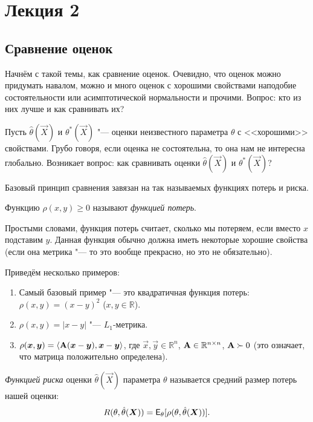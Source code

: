 
\section{Лекция 2}
\subsection{Сравнение оценок}
Начнём с такой темы, как сравнение оценок. Очевидно, что оценок можно придумать навалом, можно и много оценок с хорошими свойствами наподобие состоятельности или асимптотической нормальности и прочими. Вопрос: кто из них лучше и как сравнивать их?

Пусть $\hat{\theta}(\vec{X})$ и $\theta^{*}(\vec{X})$ "--- оценки неизвестного параметра $\theta$ с <<хорошими>> свойствами. Грубо говоря, если оценка не состоятельна, то она нам не интересна глобально. Возникает вопрос: как сравнивать оценки $\hat{\theta}(\vec{X})$ и $\theta^{*}(\vec{X})$?

Базовый принцип сравнения завязан на так называемых функциях потерь и риска. 
\begin{definition}
	Функцию $\rho(x, y) \geq 0$ называют \emph{функцией потерь}.
\end{definition}
Простыми словами, функция потерь считает, сколько мы потеряем, если вместо $x$ подставим $y$. Данная функция обычно должна иметь некоторые хорошие свойства (если она метрика "--- то это вообще прекрасно, но это не обязательно).

Приведём несколько примеров:
\begin{enumerate}[label=(\alph*)]
	\item Самый базовый пример "--- это квадратичная функция потерь: $\rho(x, y) = (x - y)^{2}$ ($x, y \in \mathbb{R}$).
	\item $\rho(x, y) = |x - y|$ "--- $L_{1}$-метрика.
	\item $\rho(\bm{x}, \bm{y}) = \langle \mathbf{A}(\bm{x} - \bm{y}), \bm{x} - \bm{y}\rangle$, где $\vec{x}, \vec{y} \in \mathbb{R}^{n}$, $\mathbf{A} \in \mathbb{R}^{n \times n}$, $\mathbf{A} \succ 0$ (это означает, что матрица положительно определена).
\end{enumerate}

\begin{definition}
	\emph{Функцией риска} оценки $\hat{\theta}(\vec{X})$ параметра $\theta$ называется средний размер потерь нашей оценки:
	\[
		R(\theta, \hat{\theta}(\bm{X})) = \operatorname{\mathsf{E}}_{\theta}[\rho(\theta, \hat{\theta}(\bm{X}))].
	\]
\end{definition}

